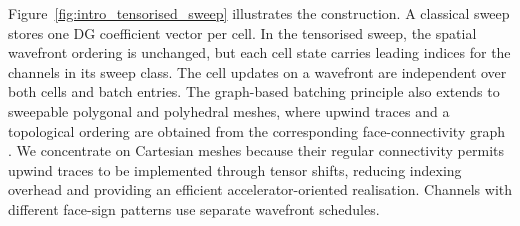 \documentclass[final]{amsart}
\begin{document}
Figure~\ref{fig:intro_tensorised_sweep} illustrates the construction.
A classical sweep stores one DG coefficient vector per cell. In the
tensorised sweep, the spatial wavefront ordering is unchanged, but
each cell state carries leading indices for the channels in its sweep
class. The cell updates on a wavefront are independent over both cells
and batch entries. The graph-based batching principle also extends to
sweepable polygonal and polyhedral meshes, where upwind traces and a
topological ordering are obtained from the corresponding
face-connectivity graph
\cite{calloo2026cycle,calloo2026diffusion,calloo2026transport}. We
concentrate on Cartesian meshes because their regular connectivity
permits upwind traces to be implemented through tensor shifts,
reducing indexing overhead and providing an efficient
accelerator-oriented realisation. Channels with different face-sign
patterns use separate wavefront schedules.
\end{document}
